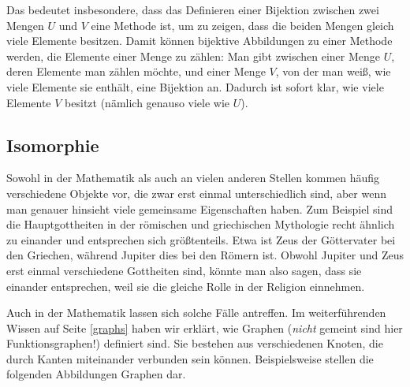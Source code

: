 \documentclass[../../main.tex]{subfiles}
\begin{document}
Das bedeutet insbesondere, dass das Definieren einer Bijektion zwischen zwei Mengen $U$ und $V$ eine Methode ist, um zu zeigen, dass die beiden Mengen gleich viele Elemente besitzen. Damit können bijektive Abbildungen zu einer Methode werden, die Elemente einer Menge zu zählen: Man gibt zwischen einer Menge $U$, deren Elemente man zählen möchte, und einer Menge $V$, von der man weiß, wie viele Elemente sie enthält, eine Bijektion an. Dadurch ist sofort klar, wie viele Elemente $V$ besitzt (nämlich genauso viele wie $U$).

\subsection*{Isomorphie}
Sowohl in der Mathematik als auch an vielen anderen Stellen kommen häufig verschiedene Objekte vor, die zwar erst einmal unterschiedlich sind, aber wenn man genauer hinsieht viele gemeinsame Eigenschaften haben. Zum Beispiel sind die Hauptgottheiten in der römischen und griechischen Mythologie recht ähnlich zu einander und entsprechen sich größtenteils. Etwa ist Zeus der Göttervater bei den Griechen, während Jupiter dies bei den Römern ist. Obwohl Jupiter und Zeus erst einmal verschiedene Gottheiten sind, könnte man also sagen, dass sie einander entsprechen, weil sie die gleiche Rolle in der Religion einnehmen.

Auch in der Mathematik lassen sich solche Fälle antreffen. Im weiterführenden Wissen auf Seite \ref{graphs} haben wir erklärt, wie Graphen (\emph{nicht} gemeint sind hier Funktionsgraphen!) definiert sind. Sie bestehen aus verschiedenen Knoten, die durch Kanten miteinander verbunden sein können. Beispielsweise stellen die folgenden Abbildungen Graphen dar.
\begin{center}
\begin{multicols}{3}
\end{multicols}
\end{center}
\end{document}
